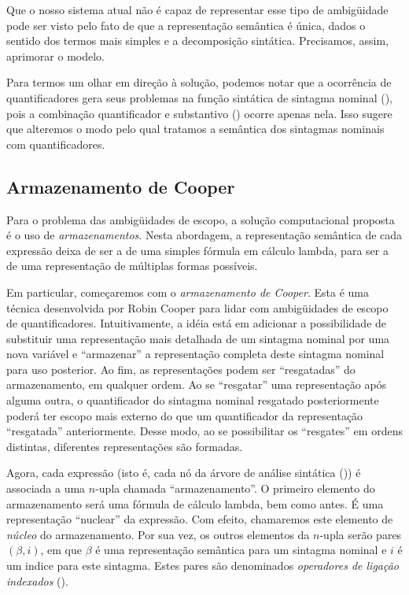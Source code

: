 Que o nosso sistema atual não é capaz de representar esse tipo de ambigüidade pode ser visto pelo fato de que a representação semântica é única, dados o sentido dos termos mais simples e a decomposição sintática. Precisamos, assim, aprimorar o modelo.

Para termos um olhar em direção à solução, podemos notar que a ocorrência de quantificadores gera seus problemas na função sintática de sintagma nominal (), pois a combinação quantificador e substantivo () ocorre apenas nela. Isso sugere que alteremos o modo pelo qual tratamos a semântica dos sintagmas nominais com quantificadores.

\subsection{Armazenamento de Cooper}

Para o problema das ambigüidades de escopo, a solução computacional proposta é o uso de \textit{armazenamentos}. Nesta abordagem, a representação semântica de cada expressão deixa de ser a de uma simples fórmula em cálculo lambda, para ser a de uma representação de múltiplas formas possíveis.

Em particular, começaremos com o \textit{armazenamento de Cooper}. Esta é uma técnica desenvolvida por Robin Cooper para lidar com ambigüidades de escopo de quantificadores. \cite[p.~113]{BlackburnBos:2005} Intuitivamente, a idéia está em adicionar a possibilidade de substituir uma representação mais detalhada de um sintagma nominal por uma nova variável e ``armazenar'' a representação completa deste sintagma nominal para uso posterior. Ao fim, as representações podem ser ``resgatadas'' do armazenamento, em qualquer ordem. Ao se ``resgatar'' uma representação após alguma outra, o quantificador do sintagma nominal resgatado posteriormente poderá ter escopo mais externo do que um quantificador da representação ``resgatada'' anteriormente. Desse modo, ao se possibilitar os ``resgates'' em ordens distintas, diferentes representações são formadas.

Agora, cada expressão (isto é, cada nó da árvore de análise sintática ()) é associada a uma $n$-upla chamada ``armazenamento''. O primeiro elemento do armazenamento será uma fórmula de cálculo lambda, bem como antes. É uma representação ``nuclear'' da expressão. Com efeito, chamaremos este elemento de \textit{núcleo} do armazenamento. Por sua vez, os outros elementos da $n$-upla serão pares $(\beta, i)$, em que $\beta$ é uma representação semântica para um sintagma nominal e $i$ é um indice para este sintagma. Estes pares são denominados \textit{operadores de ligação indexados} ().

